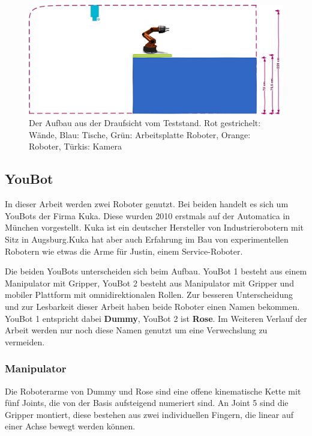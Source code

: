  
 
  \begin{figure}[h]
  	\centering
  	\includegraphics[scale=0.5]{fig/ZeichnungRaumH}   
  	\caption[Aufbau Teststand: Seitenansicht]{Der Aufbau aus der Draufsicht vom Teststand. Rot gestrichelt: Wände, Blau: Tische, Grün: Arbeitsplatte Roboter, Orange: Roboter, Türkis: Kamera}
  	\label{fig:basic-aufbau-teststandh}
  \end{figure}

\subsection{YouBot}
In dieser Arbeit werden zwei Roboter genutzt. Bei beiden handelt es sich um YouBots der Firma Kuka. Diese wurden 2010 erstmals auf der Automatica in München vorgestellt. Kuka ist ein deutscher Hersteller von Industrierobotern mit Sitz in Augsburg.Kuka hat aber auch Erfahrung im Bau von experimentellen Robotern wie etwas die Arme für Justin, einem Service-Roboter.

Die beiden YouBots unterscheiden sich beim Aufbau. YouBot 1 besteht aus einem Manipulator mit Gripper, YouBot 2 besteht aus Manipulator mit Gripper und mobiler Plattform mit omnidirektionalen Rollen. Zur besseren Unterscheidung und zur Lesbarkeit dieser Arbeit haben beide Roboter einen Namen bekommen. YouBot 1 entspricht dabei \textbf{Dummy}, YouBot 2 ist \textbf{Rose}. Im Weiteren Verlauf der Arbeit werden nur noch diese Namen genutzt um eine Verwechslung zu vermeiden.


\subsubsection{Manipulator}
 Die Roboterarme von Dummy und Rose sind eine offene kinematische Kette mit fünf Joints, die von der Basis aufsteigend numeriert sind. An Joint 5 sind die Gripper montiert, diese bestehen aus zwei individuellen Fingern, die linear auf einer Achse bewegt werden können.

